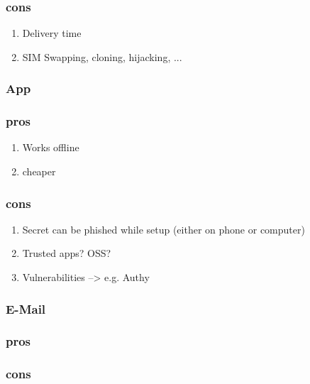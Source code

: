 \subsubsection{cons}

\begin{enumerate}
	\item Delivery time
	\item SIM Swapping, cloning, hijacking, ...
\end{enumerate}

\subsubsection{App}

\subsubsection{pros}

\begin{enumerate}
	\item Works offline
	\item cheaper
\end{enumerate}

\subsubsection{cons}

\begin{enumerate}
	\item Secret can be phished while setup (either on phone or computer)
	\item Trusted apps? OSS?
	\item Vulnerabilities --> e.g. Authy
\end{enumerate}

\subsubsection{E-Mail}

\subsubsection{pros}

\subsubsection{cons}
